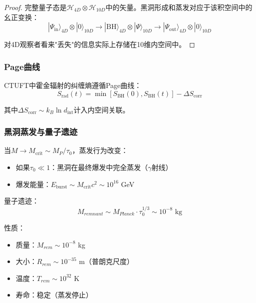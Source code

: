 \begin{proof}
完整量子态是$\mathcal{H}_{4D} \otimes \mathcal{H}_{10D}$中的矢量。黑洞形成和蒸发对应于该积空间中的幺正变换：
\begin{equation}
|\Psi_{\text{in}}\rangle_{4D} \otimes |0\rangle_{10D} \to |\text{BH}\rangle_{4D} \otimes |\Psi\rangle_{10D} \to |\Psi_{\text{out}}\rangle_{4D} \otimes |0\rangle_{10D}
\end{equation}

对4D观察者看来"丢失"的信息实际上存储在10维内空间中。
\end{proof}

\subsubsection{Page曲线}

CTUFT中霍金辐射的纠缠熵遵循Page曲线：
\begin{equation}
S_{\text{rad}}(t) = \min\left[S_{\text{BH}}(0), S_{\text{BH}}(t)\right] - \Delta S_{\text{corr}}
\end{equation}

其中$\Delta S_{\text{corr}} \sim k_B \ln d_{\text{int}}$计入内空间关联。

\subsubsection{黑洞蒸发与量子遗迹}

\begin{theorem}[黑洞终点是遗迹或爆发]
当$M \to M_{\text{crit}} \sim M_P/\tau_0$，蒸发行为改变：
\begin{itemize}
    \item 如果$\tau_0 \ll 1$：黑洞在最终爆发中完全蒸发（$\gamma$射线）
    \item 爆发能量：$E_{\text{burst}} \sim M_{\text{crit}} c^2 \sim 10^{16}$ GeV
\end{itemize}
\end{theorem}

量子遗迹：
\begin{equation}
M_{remnant} \sim M_{Planck} \cdot \tau_0^{1/3} \sim 10^{-8} \text{ kg}
\end{equation}

性质：
\begin{itemize}
    \item 质量：$M_{rem} \sim 10^{-8}$ kg
    \item 大小：$R_{rem} \sim 10^{-35}$ m（普朗克尺度）
    \item 温度：$T_{rem} \sim 10^{32}$ K
    \item 寿命：稳定（蒸发停止）
\end{itemize}

